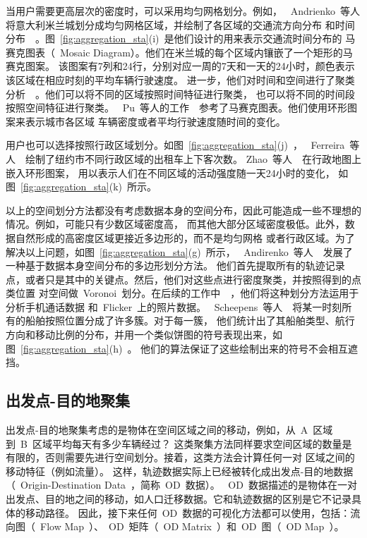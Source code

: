 \documentclass[12pt,twocolumn]{article}
\begin{document}
当用户需要更高层次的密度时，可以采用均匀网格划分。例如，
~Andrienko~等人将意大利米兰城划分成均匀网格区域，并绘制了各区域的交通流方向分布
和时间分布~\citep{AndrienkoA2008b}~。图~\ref{fig:aggregation_sta}(i)~是他们设计的用来表示交通流时间分布的
马赛克图表（~Mosaic Diagram）。他们在米兰城的每个区域内镶嵌了一个矩形的马赛克图案。
该图案有7列和24行，分别对应一周的7天和一天的24小时，颜色表示该区域在相应时刻的平均车辆行驶速度。
进一步，他们对时间和空间进行了聚类分析~\citep{AndrienkoABSVB2010}~。他们可以将不同的区域按照时间特征进行聚类，
也可以将不同的时间段按照空间特征进行聚类。
~Pu~等人的工作~\citep{PuLQN2012}~参考了马赛克图表。他们使用环形图案来表示城市各区域
车辆密度或者平均行驶速度随时间的变化。

用户也可以选择按照行政区域划分。如图~\ref{fig:aggregation_sta}(j)~，
~Ferreira~等人~\citep{FerreiraPVFS2013}~绘制了纽约市不同行政区域的出租车上下客次数。
Zhao~等人~\citep{ZhaoFH2008}~在行政地图上嵌入环形图案，
用以表示人们在不同区域的活动强度随一天24小时的变化，
如图~\ref{fig:aggregation_sta}(k)~所示。

以上的空间划分方法都没有考虑数据本身的空间分布，因此可能造成一些不理想的情况。例如，可能只有少数区域密度高，
而其他大部分区域密度极低。此外，数据自然形成的高密度区域更接近多边形的，而不是均匀网格
或者行政区域。为了解决以上问题，如图~\ref{fig:aggregation_sta}(g)~所示，
~Andirenko~等人~\citep{AndrienkoA2011}~发展了一种基于数据本身空间分布的多边形划分方法。
他们首先提取所有的轨迹记录点，或者只是其中的关键点。然后，他们对这些点进行密度聚类，并按照得到的点类位置
对空间做~Voronoi~划分。在后续的工作中~\citep{AndrienkoAMMP2010}~，他们将这种划分方法运用于分析手机通话数据
和~Flicker~上的照片数据。
~Scheepens~等人~\citep{ScheepensWW2014}~将某一时刻所有的船舶按照位置分成了许多簇。对于每一簇，
他们统计出了其船舶类型、航行方向和移动比例的分布，并用一个类似饼图的符号表现出来，如图~\ref{fig:aggregation_sta}(h)~。
他们的算法保证了这些绘制出来的符号不会相互遮挡。

\subsection{出发点-目的地聚集}
\label{subsection:aggregation_ss}

出发点-目的地聚集考虑的是物体在空间区域之间的移动，例如，从~A~区域到~B~区域平均每天有多少车辆经过？
这类聚集方法同样要求空间区域的数量是有限的，否则需要先进行空间划分。接着，这类方法会计算任何一对
区域之间的移动特征（例如流量）。
这样，轨迹数据实际上已经被转化成出发点-目的地数据（~Origin-Destination Data~，简称~OD~数据）。
~OD~数据描述的是物体在一对出发点、目的地之间的移动，如人口迁移数据。它和轨迹数据的区别是它不记录具体的移动路径。
因此，接下来任何~OD~数据的可视化方法都可以使用，包括：流向图（~Flow Map~）、~OD~矩阵（~OD Matrix~）和~OD~图（~OD Map~）。
\end{document}
